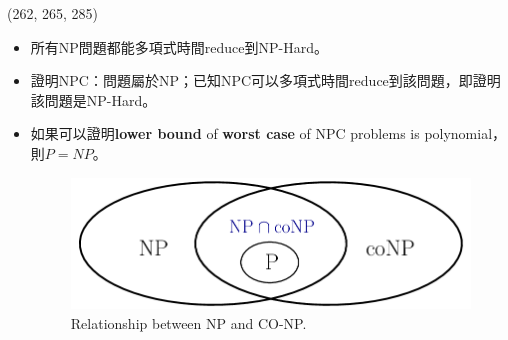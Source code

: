 \item \begin{theorem}{(262, 265, 285)} \quad\quad
    \begin{itemize}
        \item 所有NP問題都能多項式時間reduce到NP-Hard。
        \item 證明NPC：問題屬於NP；已知NPC可以多項式時間reduce到該問題，即證明該問題是NP-Hard。
        \item 如果可以證明\textbf{lower bound} of \textbf{worst case} of NPC problems is polynomial，則$P=NP$。
        \begin{figure}[H]
            \centering
            \includegraphics[scale=0.4]{img/np-conp.png}
            \caption{Relationship between NP and CO-NP.}
            \label{img:np-conp}
        \end{figure}
    \end{itemize}
\end{theorem}
